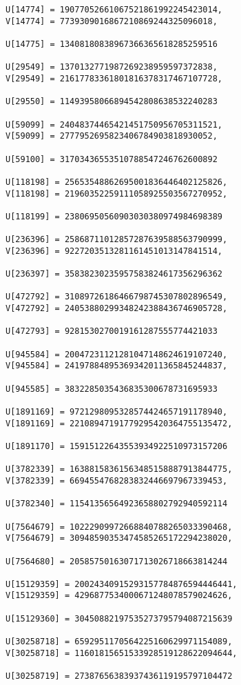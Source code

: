 \documentclass[a4paper]{article}
\begin{document}
\begin{verbatim}
U[14774] = 19077052661067521861992245423014, 
V[14774] = 7739309016867210869244325096018, 

U[14775] = 13408180838967366365618285259516

U[29549] = 1370132771987269238959597372838, 
V[29549] = 21617783361801816378317467107728, 

U[29550] = 11493958066894542808638532240283

U[59099] = 24048374465421451750956705311521, 
V[59099] = 2777952695823406784903818930052, 

U[59100] = 31703436553510788547246762600892

U[118198] = 25653548862695001836446402125826, 
V[118198] = 21960352259111058925503567270952, 

U[118199] = 23806950560903030380974984698389

U[236396] = 25868711012857287639588563790999, 
V[236396] = 9227203513281161451013147841514, 

U[236397] = 35838230235957583824617356296362

U[472792] = 31089726186466798745307802896549, 
V[472792] = 24053880299348242388436746905728, 

U[472793] = 9281530270019161287555774421033

U[945584] = 20047231121281047148624619107240, 
V[945584] = 24197884895369342011365845244837, 

U[945585] = 3832285035436835300678731695933

U[1891169] = 9721298095328574424657191178940, 
V[1891169] = 22108947191779295420364755135472, 

U[1891170] = 15915122643553934922510973157206

U[3782339] = 16388158361563485158887913844775, 
V[3782339] = 6694554768283832446697967339453, 

U[3782340] = 11541356564923658802792940592114

U[7564679] = 10222909972668840788265033390468, 
V[7564679] = 30948590353474585265172294238020, 

U[7564680] = 20585750163071713026718663814244

U[15129359] = 20024340915293157784876594446441, 
V[15129359] = 4296877534000671248078579024626, 

U[15129360] = 30450882197535273795794087215639

U[30258718] = 6592951170564225160629971154089, 
V[30258718] = 11601815651533928519128622094644, 

U[30258719] = 27387656383937436119195797104472


\end{verbatim}
\end{document}
